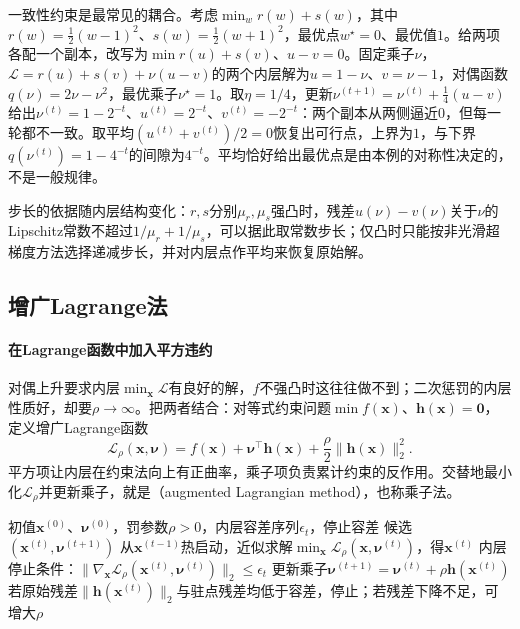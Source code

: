 一致性约束是最常见的耦合。考虑$\min_wr(w)+s(w)$，其中$r(w)=\frac12(w-1)^2$、$s(w)=\frac12(w+1)^2$，最优点$w^\star=0$、最优值$1$。给两项各配一个副本，改写为$\min r(u)+s(v)$、$u-v=0$。固定乘子$\nu$，$\mathcal L=r(u)+s(v)+\nu(u-v)$的两个内层解为$u=1-\nu$、$v=\nu-1$，对偶函数$q(\nu)=2\nu-\nu^2$，最优乘子$\nu^\star=1$。取$\eta=1/4$，更新$\nu^{(t+1)}=\nu^{(t)}+\frac14(u-v)$给出$\nu^{(t)}=1-2^{-t}$、$u^{(t)}=2^{-t}$、$v^{(t)}=-2^{-t}$：两个副本从两侧逼近$0$，但每一轮都不一致。取平均$(u^{(t)}+v^{(t)})/2=0$恢复出可行点，上界为$1$，与下界$q(\nu^{(t)})=1-4^{-t}$的间隙为$4^{-t}$。平均恰好给出最优点是由本例的对称性决定的，不是一般规律。

步长的依据随内层结构变化：$r,s$分别$\mu_r,\mu_s$强凸时，残差$u(\nu)-v(\nu)$关于$\nu$的Lipschitz常数不超过$1/\mu_r+1/\mu_s$，可以据此取常数步长；仅凸时只能按非光滑超梯度方法选择递减步长，并对内层点作平均来恢复原始解。

\subsection{增广Lagrange法}
\label{sec:opt-con-augmented-lagrangian}

\paragraph{在Lagrange函数中加入平方违约}
对偶上升要求内层$\min_{\bm x}\mathcal L$有良好的解，$f$不强凸时这往往做不到；二次惩罚的内层性质好，却要$\rho\to\infty$。把两者结合：对等式约束问题$\min f(\bm x)$、$\bm h(\bm x)=\bm0$，定义增广Lagrange函数
\begin{equation}
\label{eq:opt-con-augmented-lagrangian}
  \mathcal L_\rho(\bm x,\bm\nu)=f(\bm x)+\bm\nu^\top\bm h(\bm x)+\frac\rho2\lVert\bm h(\bm x)\rVert_2^2.
\end{equation}
平方项让内层在约束法向上有正曲率，乘子项负责累计约束的反作用。交替地最小化$\mathcal L_\rho$并更新乘子，就是（augmented Lagrangian method），也称乘子法。

\begin{algorithm}
\label{alg:opt-con-augmented-lagrangian}
\begin{algorithmic}[1]
\Require 初值$\bm x^{(0)}$、$\bm\nu^{(0)}$，罚参数$\rho>0$，内层容差序列$\epsilon_t$，停止容差
\Ensure 候选$(\bm x^{(t)},\bm\nu^{(t+1)})$
  \State 从$\bm x^{(t-1)}$热启动，近似求解$\min_{\bm x}\mathcal L_\rho(\bm x,\bm\nu^{(t)})$，得$\bm x^{(t)}$
  \State 内层停止条件：$\lVert\nabla_{\bm x}\mathcal L_\rho(\bm x^{(t)},\bm\nu^{(t)})\rVert_2\leq\epsilon_t$
  \State 更新乘子$\bm\nu^{(t+1)}=\bm\nu^{(t)}+\rho\bm h(\bm x^{(t)})$
  \State 若原始残差$\lVert\bm h(\bm x^{(t)})\rVert_2$与驻点残差均低于容差，停止；若残差下降不足，可增大$\rho$
\EndFor
\end{algorithmic}
\end{algorithm}

